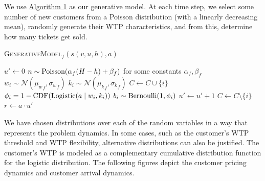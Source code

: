\documentclass[10pt,letterpaper]{article}
\begin{document}
\begin{multicols*}{2}
We use \hyperref[alg:generative-model]{Algorithm 1} as our generative model. At each time step, we select some number of new customers from a Poisson distribution (with a linearly decreasing mean), randomly generate their WTP characteristics, and from this, determine how many tickets get sold.

\begin{algorithm}[H]
\label{alg:generative-model}
	\caption{\textsc{GenerativeModel$_f (s (v, u, h), a)$}}
	\small\begin{algorithmic}[1]
	    \State $u' \leftarrow 0$
	    \State $n \sim \textnormal{Poisson}(\alpha_f (H-h) + \beta_f)$ for some constants $\alpha_f, \beta_f$ %
            \State $w_{i} \sim \mathcal{N}({\mu_w}_f, {\sigma_w}_f)$
            \State $k_{i} \sim \mathcal{N}({\mu_k}_f, {\sigma_k}_f)$
            \State $C \leftarrow C \cup \{i\}$
        \EndFor
            \State $\phi_{i} = 1 - \textnormal{CDF(Logistic}(a \mid w_i, k_i))$
            \State $b_i \sim \textnormal{Bernoulli}(1,\phi_i)$
                \State $u' \leftarrow u' + 1$
                \State $C \leftarrow C \setminus \{i\}$
            \EndIf
        \EndFor
	    \State ${r} \leftarrow a \cdot u'$       
		\State{}
	\end{algorithmic}
\end{algorithm}

We have chosen distributions over each of the random variables in a way that represents the problem dynamics. In some cases, such as the customer's WTP threshold and WTP flexibility, alternative distributions can also be justified. The customer's WTP is modeled as a complementary cumulative distribution function for the logistic distribution. The following figures depict the customer pricing dynamics and customer arrival dynamics.


\end{multicols*}
\end{document}
